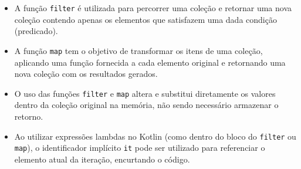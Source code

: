 \documentclass[12pt,a4paper]{article}
\begin{document}
\begin{itemize}[label={(\ \ \ )}]
    \item A função \texttt{filter} é utilizada para percorrer uma coleção e retornar uma nova coleção contendo apenas os elementos que satisfazem uma dada condição (predicado).
    \item A função \texttt{map} tem o objetivo de transformar os itens de uma coleção, aplicando uma função fornecida a cada elemento original e retornando uma nova coleção com os resultados gerados.
    \item O uso das funções \texttt{filter} e \texttt{map} altera e substitui diretamente os valores dentro da coleção original na memória, não sendo necessário armazenar o retorno.
    \item Ao utilizar expressões lambdas no Kotlin (como dentro do bloco do \texttt{filter} ou \texttt{map}), o identificador implícito \texttt{it} pode ser utilizado para referenciar o elemento atual da iteração, encurtando o código.
\end{itemize}
\end{document}
